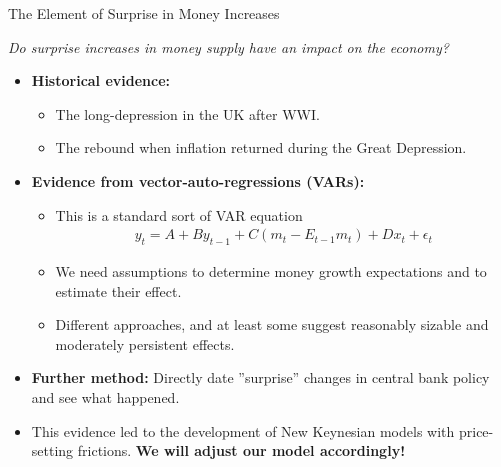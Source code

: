 \documentclass[10pt,c,aspectratio=1610,handout]{beamer}
\begin{document}
\begin{frame}{The Element of Surprise in Money Increases}%
  \begin{center}%
    \begin{large}%
      \emph{Do surprise increases in money supply have an impact on the economy?}%
    \end{large}%
  \end{center}%
  \pause%
  \begin{itemize}%
    \item[$\blacktriangleright$] \textbf{Historical evidence:} 
    \begin{itemize}%
      \item[$\rightarrow$] The long-depression in the UK after WWI.%
      \item[$\rightarrow$] The rebound when inflation returned during the Great Depression.%
    \end{itemize}%
    \pause%
    \item[$\blacktriangleright$] \textbf{Evidence from vector-auto-regressions (VARs):}%
    \begin{itemize}%
      \item[$\rightarrow$] This is a standard sort of VAR equation%
      \begin{align*} %
        y_t = A + B y_{t-1} + C ( m_t - E_{t-1} m_t ) + D x_t + \epsilon_t %
      \end{align*}%
      \item[$\rightarrow$] We need assumptions to determine money growth expectations and to estimate their effect.%
      \item[$\rightarrow$] Different approaches, and at least some suggest reasonably sizable and moderately persistent effects.%
    \end{itemize}%
    \pause%
    \item[$\blacktriangleright$] \textbf{Further method:} Directly date ''surprise'' changes in central bank policy and see what happened.%
    \vspace*{0.1in}%
    \pause%
    \item[$\Rightarrow$] This evidence led to the development of New Keynesian models with price-setting frictions. \textbf{We will adjust our model accordingly!}%
  \end{itemize}%
\end{frame}%
\end{document}
